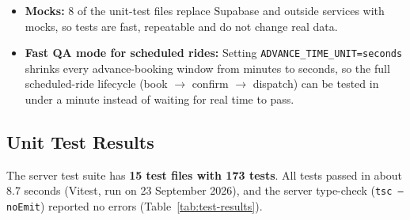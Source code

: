 \begin{itemize}
  \item \textbf{Mocks:} 8 of the unit-test files replace Supabase and outside
        services with mocks, so tests are fast, repeatable and do not change
        real data.
  \item \textbf{Fast QA mode for scheduled rides:} Setting
        \texttt{ADVANCE\_TIME\_UNIT=seconds} shrinks every advance-booking
        window from minutes to seconds, so the full scheduled-ride lifecycle
        (book $\rightarrow$ confirm $\rightarrow$ dispatch) can be tested in
        under a minute instead of waiting for real time to pass.
\end{itemize}

\subsection{Unit Test Results}
\label{subsec:unit-results}

The server test suite has \textbf{15 test files with 173 tests}. All tests
passed in about 8.7 seconds (Vitest, run on 23 September 2026), and the server
type-check (\texttt{tsc --noEmit}) reported no errors
(Table~\ref{tab:test-results}).

